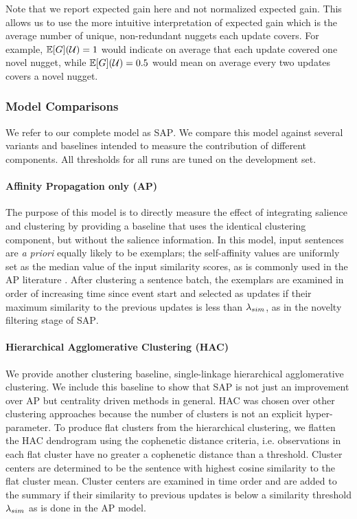Note that we report expected gain here and not normalized expected gain.  This
allows us to use the more intuitive interpretation of expected gain which is
the average number of unique, non-redundant nuggets each update covers. For
example, $\mathbb{E}[G](\mathcal{U})=1$ would indicate on average that each update
covered one novel nugget, while $\mathbb{E}[G](\mathcal{U})=0.5$ would mean on average
every two updates covers a novel nugget.

\subsubsection{Model Comparisons}

We refer to our complete model as \textsc{SAP}.  We compare this model against
several variants and baselines intended to measure the contribution of
different components. All thresholds for all runs are tuned on the development
set.


\paragraph{Affinity Propagation only (\textsc{AP})} The purpose of this model
is to directly measure the effect of integrating salience and clustering by
providing a baseline that uses the identical clustering component, but without
the salience information. In this model, input sentences are \textit{a priori}
equally likely to be exemplars; the self-affinity values are uniformly set as
the median value of the  input similarity scores, as is commonly used in the
\textsc{AP} literature \citep{frey2007}. After clustering a sentence batch, the
exemplars are examined in order of increasing time since event start and
selected as updates if their maximum similarity to the previous updates is less
than ${\lambda_{sim}}$, as in the novelty filtering stage of \textsc{SAP}.

\paragraph{Hierarchical Agglomerative Clustering (HAC)} We provide another
clustering baseline, single-linkage hierarchical agglomerative clustering.  We
include this baseline to show that SAP is not just an improvement over
\textsc{AP} but centrality driven methods in general.  \textsc{HAC} was chosen
over other clustering approaches because the number of clusters is not an
explicit hyper-parameter. To produce flat clusters from the hierarchical
clustering, we flatten the \textsc{HAC} dendrogram using the cophenetic
distance criteria, i.e.  observations in each flat cluster have no greater a
cophenetic distance than a threshold. Cluster centers are determined to be the
sentence with highest cosine similarity to the flat cluster mean.  Cluster
centers are examined in time order and are added to the summary if their
similarity to previous updates is below a similarity threshold ${\lambda_{sim}}$ as
is done in the \textsc{AP} model.

